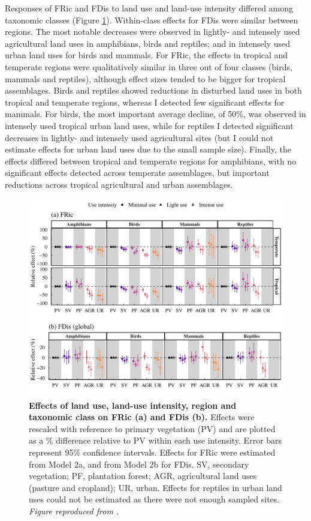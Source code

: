 Responses of FRic and FDis to land use and land-use intensity differed among taxonomic classes (Figure \ref{chap3_fig3}). Within-class effects for FDis were similar between regions. The most notable decreases were observed in lightly- and intensely used agricultural land uses in amphibians, birds and reptiles; and in intensely used urban land uses for birds and mammals. For FRic, the effects in tropical and temperate regions were qualitatively similar in three out of four classes (birds, mammals and reptiles), although effect sizes tended to be bigger for tropical assemblages. Birds and reptiles showed reductions in disturbed land uses in both tropical and temperate regions, whereas I detected few significant effects for mammals. For birds, the most important average decline, of 50\%, was observed in intensely used tropical urban land uses, while for reptiles I detected significant decreases in lightly- and intensely used agricultural sites (but I could not estimate effects for urban land uses due to the small sample size). Finally, the effects differed between tropical and temperate regions for amphibians, with no significant effects detected across temperate assemblages, but important reductions across tropical agricultural and urban assemblages.

\begin{figure}[h!]
\centering
\includegraphics[scale=0.75]{figures/Chapter_FD/Figure3}
\caption[Effects of land use, land-use intensity, region and taxonomic class on FRic (a) and FDis (b).]{\textbf{Effects of land use, land-use intensity, region and taxonomic class on FRic (a) and FDis (b).} Effects were rescaled with reference to primary vegetation (PV) and are plotted as a \% difference relative to PV within each use intensity. Error bars represent 95\% confidence intervals. Effects for FRic were estimated from Model 2a, and from Model 2b for FDis. SV, secondary vegetation; PF, plantation forest; AGR, agricultural land uses (pasture and cropland); UR, urban. Effects for reptiles in urban land uses could not be estimated as there were not enough sampled sites. \textit{Figure reproduced from \citet{Etard2021}.}}
\label{chap3_fig3}
\end{figure}

